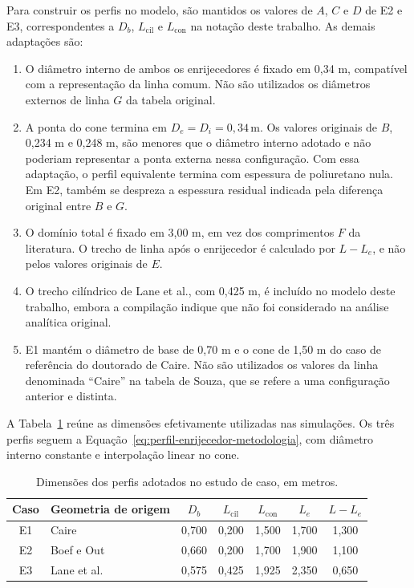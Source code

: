 \documentclass[arial,centeredequations,english,brazilian,oneside,section=TITLE]{ifes8}
\begin{document}
Para construir os perfis no modelo, são mantidos os valores de $A$, $C$
e $D$ de E2 e E3, correspondentes a $D_b$, $L_{\mathrm{cil}}$ e
$L_{\mathrm{con}}$ na notação deste trabalho. As demais adaptações são:
\begin{enumerate}
  \item O diâmetro interno de ambos os enrijecedores é fixado em 0,34 m,
  compatível com a representação da linha comum. Não são utilizados os
  diâmetros externos de linha $G$ da tabela original.
  \item A ponta do cone termina em $D_e=D_i=0{,}34\,\mathrm{m}$.
  Os valores originais de $B$, 0,234 m e 0,248 m, são menores que o
  diâmetro interno adotado e não poderiam representar a ponta externa
  nessa configuração. Com essa adaptação, o perfil equivalente termina
  com espessura de poliuretano nula. Em E2, também se despreza a
  espessura residual indicada pela diferença original entre $B$ e $G$.
  \item O domínio total é fixado em 3,00 m, em vez dos comprimentos $F$
  da literatura. O trecho de linha após o enrijecedor é calculado por
  $L-L_e$, e não pelos valores originais de $E$.
  \item O trecho cilíndrico de Lane et al., com 0,425 m, é incluído no
  modelo deste trabalho, embora a compilação indique que não foi
  considerado na análise analítica original.
  \item E1 mantém o diâmetro de base de 0,70 m e o cone de 1,50 m do
  caso de referência do doutorado de Caire. Não são utilizados os valores
  da linha denominada ``Caire'' na tabela de Souza, que se refere a uma
  configuração anterior e distinta.
\end{enumerate}

A Tabela~\ref{tab:geometrias-adotadas-estudo} reúne as dimensões efetivamente
utilizadas nas simulações. Os três perfis seguem a
Equação~\eqref{eq:perfil-enrijecedor-metodologia}, com diâmetro interno
constante e interpolação linear no cone.

\begin{table}[!htbp]
  \centering
  \caption{Dimensões dos perfis adotados no estudo de caso, em metros.}
  \label{tab:geometrias-adotadas-estudo}
  \begin{tabular}{c l c c c c c}
    \hline
    Caso & Geometria de origem & $D_b$ & $L_{\mathrm{cil}}$
      & $L_{\mathrm{con}}$ & $L_e$ & $L-L_e$\\
    \hline
    E1 & Caire & 0,700 & 0,200 & 1,500 & 1,700 & 1,300\\
    E2 & Boef e Out & 0,660 & 0,200 & 1,700 & 1,900 & 1,100\\
    E3 & Lane et al. & 0,575 & 0,425 & 1,925 & 2,350 & 0,650\\
    \hline
  \end{tabular}
\end{table}
\end{document}
